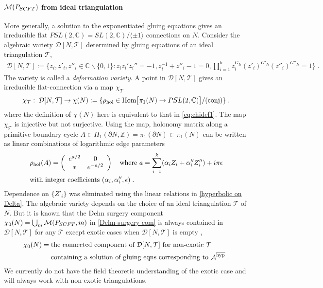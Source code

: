 \documentclass[a4paper,11pt]{article}
\def\cT{\mathcal{T}}
\def\cD{\mathcal{D}}
\def\CA{{\cal A}}
\def\CM{{\cal M}}
\begin{document}
\paragraph{$\CM(P_{SCFT})$ from ideal triangulation}  More generally, a solution to the exponentiated gluing equations  gives an irreducible flat $PSL(2,\mathbb{C})=SL(2,\mathbb{C})/\langle \pm 1\rangle$ connections on $N$. %
Consider the algebraic variety $\cD[N,\cT]$ determined by gluing equations of an ideal triangulation $\cT$,
%
\begin{align}
\cD[N,\cT]:=\{ z_i, z'_i, z''_i \in \mathbb{C}\backslash \{ 0,1\}: z_i z_i' z_i''=-1, z_i^{-1}+z''_i-1=0, \prod_{i=1}^k z_i^{G_{Ii}}(z'_i)^{G'_{Ii}} (z''_i)^{G''_{Ii}}=1\}\;.
\label{deformation variety}
 \end{align}
The variety  is called a {\it deformation variety}.  A point in $\cD[N,\cT]$ gives an irreducible flat-connection via a map $\chi_T$%
 \begin{align}
 \chi_{\cT} : \; \cD[N,\cT] \rightarrow \chi (N):=\{  \rho_{\rm hol} \in \textrm{Hom}\big{[}\pi_1 (N) \rightarrow PSL(2,\mathbb{C})\big{]}/(\textrm{conj}) \}\;. 
 \end{align}
%
where the definition of $\chi(N)$ here is equivalent to that in \eqref{eq:chidef1}.
The map $ \chi_{\cT}$ is injective but not surjective.  
Using the map, holonomy matrix along a primitive boundary  cycle $A\in H_1 (\partial N,\mathbb{Z}) = \pi_1 (\partial N) \subset \pi_1 (N)$ can be written as linear combinations of logarithmic edge parameters
%
\begin{align}
\begin{split}
& \rho_{\rm hol}(A) = \left(\begin{array}{cc}e^{a/2} & 0 \\ * & e^{-a/2}\end{array}\right) \quad \textrm{where }a=\sum_{i=1}^k (\alpha_i Z_i +\alpha''_i Z''_i)+ i \pi \epsilon 
\\
&\textrm{with integer coefficients }(\alpha_i, \alpha''_i ,  \epsilon)\;. \label{Hol(A) in terms of edges}
\end{split}
\end{align}
%
Dependence on $\{Z'_i\}$ was eliminated using the linear relations in  \eqref{hyperbolic on Delta}.
The algebraic variety depends on the choice of an ideal triangulation $\cT$ of $N$.  
But it is known that  the Dehn surgery component $\chi_0(N)=\bigcup_m \CM(P_{SCFT},m)$ 
in \eqref{Dehn-surgery com} is always contained in $\cD[N,\cT]$ for any $\cT$  except exotic cases when  $\cD[N,\cT]$ is empty \cite{tillmann2012degenerations},
%
\begin{align}
\begin{split}
\chi_0(N)=\; &\textrm{the connected component of $\cD[N,\cT]$ for non-exotic $\cT$  }
\\
&\textrm{containing a  solution  of gluing eqns corresponding to $\CA^{\rm \overline{hyp}}$} \;. \label{Dehn-surgery com-2}
\end{split}
\end{align}
%
We currently do not have the field theoretic understanding of the exotic case and will always work with non-exotic triangulations. 
\end{document}

